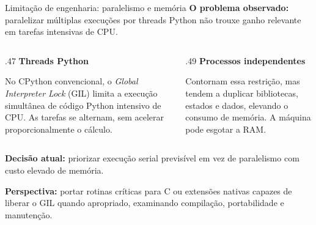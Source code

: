 \begin{frame}{Limitação de engenharia: paralelismo e memória}
\textbf{O problema observado:} paralelizar múltiplas execuções por threads Python não trouxe ganho relevante em tarefas intensivas de CPU.
\vspace{.25cm}
\begin{columns}[T,onlytextwidth]
\begin{column}{.47\textwidth}
\textbf{Threads Python}\par\smallskip
No CPython convencional, o \emph{Global Interpreter Lock} (GIL) limita a execução simultânea de código Python intensivo de CPU. As tarefas se alternam, sem acelerar proporcionalmente o cálculo.
\end{column}
\begin{column}{.49\textwidth}
\textbf{Processos independentes}\par\smallskip
Contornam essa restrição, mas tendem a duplicar bibliotecas, estados e dados, elevando o consumo de memória. A máquina pode esgotar a RAM.
\end{column}
\end{columns}
\vspace{.32cm}
\textbf{Decisão atual:} priorizar execução serial previsível em vez de paralelismo com custo elevado de memória.
\par\medskip
\textbf{Perspectiva:} portar rotinas críticas para C ou extensões nativas capazes de liberar o GIL quando apropriado, examinando compilação, portabilidade e manutenção.
\end{frame}

